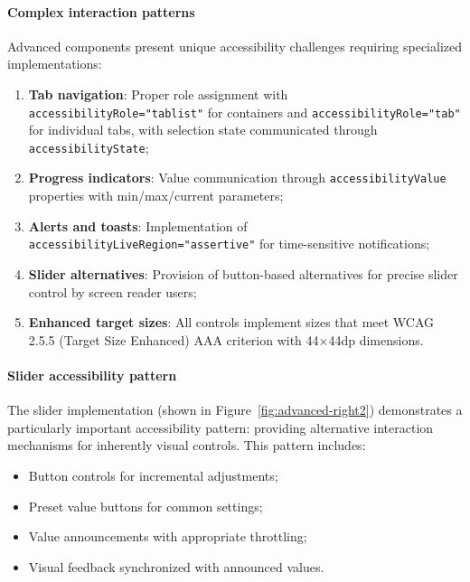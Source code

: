 \paragraph{Complex interaction patterns}

Advanced components present unique accessibility challenges requiring specialized implementations:

\begin{enumerate}
    \item \textbf{Tab navigation}: Proper role assignment with \texttt{accessibilityRole="tablist"} for containers and \texttt{accessibilityRole="tab"} for individual tabs, with selection state communicated through \texttt{accessibilityState};
    
    \item \textbf{Progress indicators}: Value communication through \texttt{accessibilityValue} properties with min/max/current parameters;
    
    \item \textbf{Alerts and toasts}: Implementation of \texttt{accessibilityLiveRegion="assertive"} for time-sensitive notifications;
    
    \item \textbf{Slider alternatives}: Provision of button-based alternatives for precise slider control by screen reader users;
    
    \item \textbf{Enhanced target sizes}: All controls implement sizes that meet WCAG 2.5.5 (Target Size Enhanced) AAA criterion with 44×44dp dimensions.
\end{enumerate}

\paragraph{Slider accessibility pattern}

The slider implementation (shown in Figure~\ref{fig:advanced-right2}) demonstrates a particularly important accessibility pattern: providing alternative interaction mechanisms for inherently visual controls. This pattern includes:

\begin{itemize}
    \item Button controls for incremental adjustments;
    \item Preset value buttons for common settings;
    \item Value announcements with appropriate throttling;
    \item Visual feedback synchronized with announced values.
\end{itemize}

